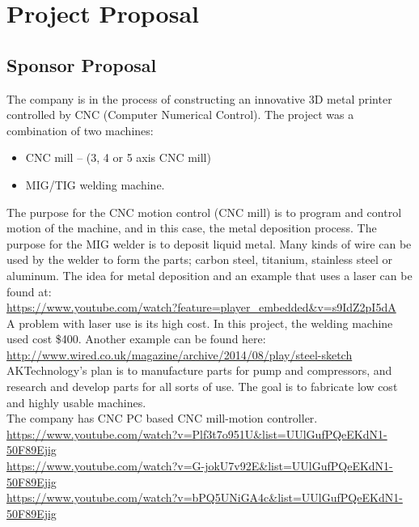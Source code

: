 \documentclass[12pt]{article}
\newlength\tindent
\renewcommand{\indent}{\hspace*{\tindent}}
\begin{document}
\section{Project Proposal}

\subsection{Sponsor Proposal}

\indent The company is in the process of constructing an innovative 3D metal printer controlled by CNC (Computer Numerical Control). The project was a combination of two machines:


\begin{itemize}


\item CNC mill – (3, 4 or 5 axis CNC mill)
\item MIG/TIG welding machine.
\end{itemize}

\indent The purpose for the CNC motion control (CNC mill) is to program and control motion of the machine, and in this case, the metal deposition process. The purpose for the MIG welder is to deposit liquid metal. Many kinds of wire can be used by the welder to form the parts; carbon steel, titanium, stainless steel or aluminum.
The idea for metal deposition and an example that uses a laser can be found at:\\
\href{https://www.youtube.com/watch?feature=player_embedded&v=s9IdZ2pI5dA}{https://www.youtube.com/watch?feature=player\_embedded\&v=s9IdZ2pI5dA}
\\
\indent A problem with laser use is its high cost. In this project, the welding machine used cost \$400. Another example can be found here:\\
\href{http://www.wired.co.uk/magazine/archive/2014/08/play/steel-sketch}{http://www.wired.co.uk/magazine/archive/2014/08/play/steel-sketch}\\
\indent AKTechnology's plan is to manufacture parts for pump and compressors, and research and develop parts for all sorts of use. The goal is to fabricate low cost and highly usable machines.\\ 
 
\indent The company has CNC PC based CNC mill-motion controller.\\
\href{https://www.youtube.com/watch?v=Plf3t7o951U&list=UUlGufPQeEKdN1-50F89Ejig}{https://www.youtube.com/watch?v=Plf3t7o951U\&list=UUlGufPQeEKdN1-50F89Ejig}\\
\href{https://www.youtube.com/watch?v=G-jokU7v92E&list=UUlGufPQeEKdN1-50F89Ejig}{https://www.youtube.com/watch?v=G-jokU7v92E\&list=UUlGufPQeEKdN1-50F89Ejig}\\
\href{https://www.youtube.com/watch?v=bPQ5UNiGA4c&list=UUlGufPQeEKdN1-50F89Ejig}{https://www.youtube.com/watch?v=bPQ5UNiGA4c\&list=UUlGufPQeEKdN1-50F89Ejig}\\
 
\end{document}
